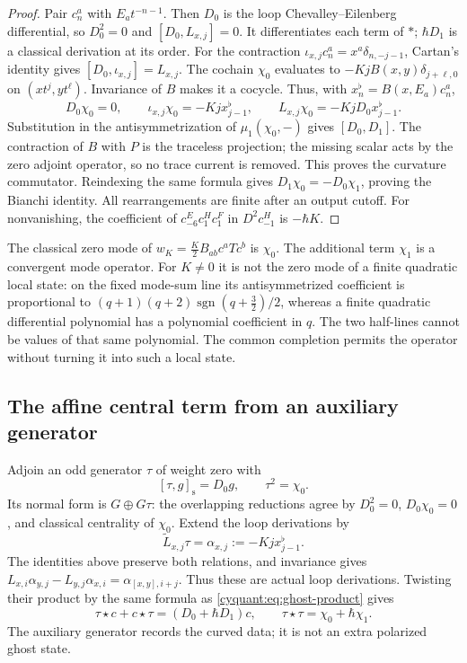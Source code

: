 \begin{proof}
Pair $c_n^a$ with $E_at^{-n-1}$.  Then $D_0$ is the loop
Chevalley--Eilenberg differential, so $D_0^2=0$ and
$[D_0,L_{x,j}]=0$.  It differentiates each term of $*$;
$\hbar D_1$ is a classical derivation at its order.
For the contraction $\iota_{x,j}c_n^a=x^a\delta_{n,-j-1}$,
Cartan's identity gives $[D_0,\iota_{x,j}]=L_{x,j}$.
The cochain $\chi_0$ evaluates to
$-KjB(x,y)\delta_{j+\ell,0}$ on $(xt^j,yt^\ell)$.
Invariance of $B$ makes it a cocycle.  Thus, with
$x_n^\flat=B(x,E_a)c_n^a$,
\[
 D_0\chi_0=0,\qquad
 \iota_{x,j}\chi_0=-Kj x_{j-1}^\flat,
 \qquad L_{x,j}\chi_0=-KjD_0x_{j-1}^\flat.
\]
Substitution in the antisymmetrization of $\mu_1(\chi_0,-)$ gives
$[D_0,D_1]$.  The contraction of $B$ with $P$ is the traceless
projection; the missing scalar acts by the zero adjoint operator, so
no trace current is removed.  This proves the curvature commutator.
Reindexing the same formula gives $D_1\chi_0=-D_0\chi_1$, proving
the Bianchi identity.  All rearrangements are finite after an output
cutoff.  For nonvanishing, the coefficient of
$c_{-6}^Ec_1^Hc_1^F$ in $D^2c_{-1}^H$ is $-\hbar K$.
\end{proof}

The classical zero mode of $w_K=\frac K2B_{ab}c^aTc^b$ is $\chi_0$.
The additional term $\chi_1$ is a convergent mode operator.  For
$K\ne0$ it is not the zero mode of a finite quadratic local state:
on the fixed mode-sum line its antisymmetrized coefficient is
proportional to
$(q+1)(q+2)\operatorname{sgn}(q+\frac32)/2$, whereas a finite
quadratic differential polynomial has a polynomial coefficient in
$q$.  The two half-lines cannot be values of that same polynomial.
The common completion permits the operator without turning it into
such a local state.

\subsection{The affine central term from an auxiliary generator}

Adjoin an odd generator $\tau$ of weight zero with
\[
 [\tau,g]_{\mathrm s}=D_0g,\qquad \tau^2=\chi_0.
\]
Its normal form is $G\oplus G\tau$: the overlapping reductions agree
by $D_0^2=0$, $D_0\chi_0=0$, and classical centrality of $\chi_0$.
Extend the loop derivations by
\[
 \widetilde L_{x,j}\tau=\alpha_{x,j}:=-Kj x_{j-1}^\flat.
\]
The identities above preserve both relations, and invariance gives
$L_{x,i}\alpha_{y,j}-L_{y,j}\alpha_{x,i}=\alpha_{[x,y],i+j}$.
Thus these are actual loop derivations.  Twisting their product by
the same formula as \eqref{cyquant:eq:ghost-product} gives
\[
 \tau\star c+c\star\tau=(D_0+\hbar D_1)c,
 \qquad \tau\star\tau=\chi_0+\hbar\chi_1.
\]
The auxiliary generator records the curved data; it is not an extra
polarized ghost state.

